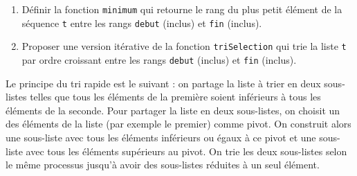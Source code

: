 \begin{question}\mbox{}
\begin{enumerate}
\item Définir la fonction \texttt{minimum} qui retourne le rang du plus petit élément 
	de la séquence \texttt{t} entre les rangs \texttt{debut} (inclus) et \texttt{fin} (inclus).
\item Proposer une version itérative de la fonction \texttt{triSelection} 
	qui trie la liste {\tt t} par ordre croissant entre les rangs \texttt{debut} (inclus) 
	et \texttt{fin} (inclus).
\end{enumerate}

\end{question}

Le principe du tri rapide  est le suivant : on partage la 
liste à trier en deux sous-listes telles que tous les éléments de la première 
soient inférieurs à tous les éléments de la seconde.
Pour partager la liste en deux sous-listes, on choisit un des éléments de la liste
(par exemple le premier) comme pivot. On construit alors une sous-liste
avec tous les éléments inférieurs ou égaux à ce pivot et une sous-liste avec 
tous les éléments supérieurs au pivot.
On trie les deux sous-listes selon le même processus jusqu'à avoir des sous-listes 
réduites à un seul élément.


